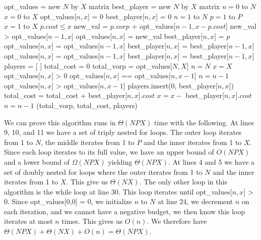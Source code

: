\documentclass[11pt]{article}
\begin{document}
\begin{codebox}
\li opt\_values = new $N$ by $X$ matrix
\li best\_player = new $N$ by $X$ matrix
\li
\li \For $n = 0$ to $N$ \Do
\li     \For $x = 0$ to $X$ \Do
\li         opt\_values[$n,x$] = 0
\li         best\_player[$n,x$] = 0
        \End
\li \End
\li \For $n=1$ to $N$ \Do
\li     \For $p=1$ to $P$ \Do
\li         \For $x=1$ to $X$ \Do
\li             \If $p.cost \leq x$ \Then
\li                 new\_val = $p.vorp$ + opt\_values[$n-1, x - p.cost$]
\li                 \If new\_val > opt\_values[$n-1, x$] \Then
\li                     opt\_values[$n,x$] = new\_val
\li                     best\_player[$n,x$] = $p$
                    \Else
\li                     opt\_values[$n,x$] = opt\_values[$n-1, x$]
\li                     best\_player[$n,x$] = best\_player[$n-1, x$]
                    \End
\li             \Else
\li                 opt\_values[$n,x$] = opt\_values[$n-1, x$]
\li                 best\_player[$n,x$] = best\_player[$n-1, x$]
                \End
            \End
        \End
\li \End
\li {}
\li players = [ ]
\li total\_cost = 0
\li total\_vorp = opt\_values[$N,X$]
\li $n = N$
\li $x = X$
\li
\li \While opt\_values[$n,x$] > 0 \Do
\li     {}
\li     \If opt\_values[$n,x$] == opt\_values[$n,x-1$] \Then
\li         $n = n - 1$
\li     {}
\li     {}
\li     \ElseIf opt\_values[$n,x$] > opt\_values[$n,x-1$] \Then
\li         players.insert(0, best\_player[$n,x$])
\li         total\_cost = total\_cost + best\_player[$n,x$]$.cost$
\li         $x = x -$ best\_player[$n,x$]$.cost$
\li         $n = n - 1$
        \End
\li \End
\li \Return (total\_vorp, total\_cost, players)
\end{codebox}

\newpage

We can prove this algorithm runs in $\Theta(NPX)$ time with the following. At lines 9, 10, and 11 we have a set of triply nested for loops. The outer loop iterates from 1 to $N$, the middle iterates from 1 to $P$ and the inner iterates from 1 to $X$. Since each loop iterates to its full value, we have an upper bound of $O(NPX)$ and a lower bound of $\Omega(NPX)$ yielding $\Theta(NPX)$. At lines 4 and 5 we have a set of doubly nested for loops where the outer iterates from 1 to $N$ and the inner iterates from 1 to $X$. This give us $\Theta(NX)$. The only other loop in this algorithm is the while loop at line 30. This loop iterates until opt\_values[$n,x$] > 0. Since opt\_values[0,0] = 0, we initialize $n$ to $N$ at line 24, we decrement $n$ on each iteration, and we cannot have a negative budget, we then know this loop iterates at most $n$ times. This gives us $O(n)$. We therefore have $\Theta(NPX) + \Theta(NX) + O(n) = \Theta(NPX)$.
\end{document}
